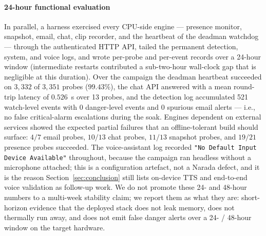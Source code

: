 \documentclass{ieeeaccess}
\begin{document}
\paragraph*{24-hour functional evaluation}
In parallel, a harness exercised every CPU-side engine --- presence monitor, snapshot, email, chat, clip recorder, and the heartbeat of the deadman watchdog --- through the authenticated HTTP API, tailed the permanent detection, system, and voice logs, and wrote per-probe and per-event records over a 24-hour window (intermediate restarts contributed a sub-two-hour wall-clock gap that is negligible at this duration). Over the campaign the deadman heartbeat succeeded on $3{,}332$ of $3{,}351$ probes ($99.43\%$), the chat API answered with a mean round-trip latency of $0.526$~s over 13 probes, and the detection log accumulated 521 watch-level events with 0 danger-level events and 0 spurious email alerts --- i.e., no false critical-alarm escalations during the soak. Engines dependent on external services showed the expected partial failures that an offline-tolerant build should surface: $4/7$ email probes, $10/13$ chat probes, $11/13$ snapshot probes, and $19/21$ presence probes succeeded. The voice-assistant log recorded \texttt{"No Default Input Device Available"} throughout, because the campaign ran headless without a microphone attached; this is a configuration artefact, not a Narada defect, and it is the reason Section~\ref{sec:conclusion} still lists on-device TTS and end-to-end voice validation as follow-up work. We do not promote these 24- and 48-hour numbers to a multi-week stability claim; we report them as what they are: short-horizon evidence that the deployed stack does not leak memory, does not thermally run away, and does not emit false danger alerts over a 24- / 48-hour window on the target hardware.
\end{document}

